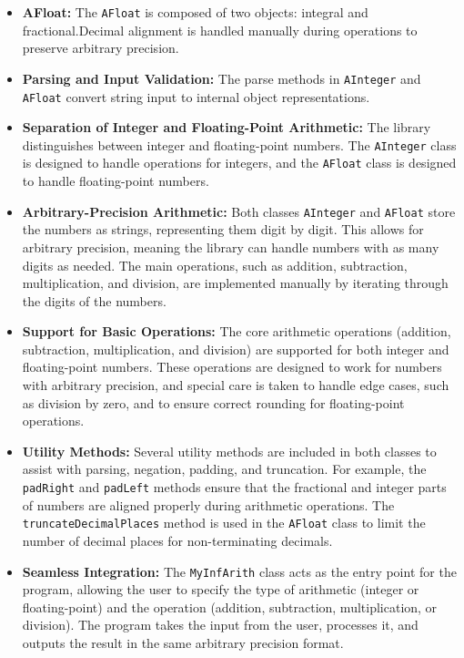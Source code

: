 \documentclass{article}
\begin{document}
\begin{itemize}
    \item \textbf{AFloat:}
    The \texttt{AFloat} is composed of two objects: integral and fractional.Decimal alignment is handled manually during operations to preserve arbitrary precision.

    \item \textbf{Parsing and Input Validation:}
    The parse methods in \texttt{AInteger} and \texttt{AFloat} convert string input to internal object representations.
    
    \item \textbf{Separation of Integer and Floating-Point Arithmetic:} 
    The library distinguishes between integer and floating-point numbers. The \texttt{AInteger} class is designed to handle operations for integers, and the \texttt{AFloat} class is designed to handle floating-point numbers. 
    
    \item \textbf{Arbitrary-Precision Arithmetic:}
    Both classes \texttt{AInteger} and \texttt{AFloat} store the numbers as strings, representing them digit by digit. This allows for arbitrary precision, meaning the library can handle numbers with as many digits as needed. The main operations, such as addition, subtraction, multiplication, and division, are implemented manually by iterating through the digits of the numbers.


    \item \textbf{Support for Basic Operations:} 
    The core arithmetic operations (addition, subtraction, multiplication, and division) are supported for both integer and floating-point numbers. These operations are designed to work for numbers with arbitrary precision, and special care is taken to handle edge cases, such as division by zero, and to ensure correct rounding for floating-point operations.

    \item \textbf{Utility Methods:}
    Several utility methods are included in both classes to assist with parsing, negation, padding, and truncation. For example, the \texttt{padRight} and \texttt{padLeft} methods ensure that the fractional and integer parts of numbers are aligned properly during arithmetic operations. The \texttt{truncateDecimalPlaces} method is used in the \texttt{AFloat} class to limit the number of decimal places for non-terminating decimals.

    \item \textbf{Seamless Integration:} 
    The \texttt{MyInfArith} class acts as the entry point for the program, allowing the user to specify the type of arithmetic (integer or floating-point) and the operation (addition, subtraction, multiplication, or division). The program takes the input from the user, processes it, and outputs the result in the same arbitrary precision format.


\end{itemize}
\end{document}
